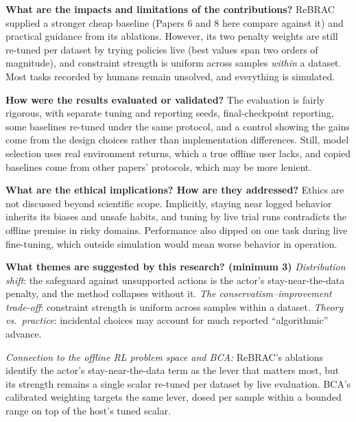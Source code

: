 \documentclass[11pt]{article}
\newcommand{\q}[2]{\item \textbf{#1} #2}
\newcommand{\tiein}[1]{\par\smallskip\noindent\emph{Connection to the offline RL problem space and BCA:} #1\par\medskip}
\begin{document}
\begin{qna}
\q{What are the impacts and limitations of the contributions?}
ReBRAC supplied a stronger cheap baseline (Papers 6 and 8 here compare against it) and practical guidance from its ablations. However, its two penalty weights are still re-tuned per dataset by trying policies live (best values span two orders of magnitude), and constraint strength is uniform across samples \emph{within} a dataset. Most tasks recorded by humans remain unsolved, and everything is simulated.

\q{How were the results evaluated or validated?}
The evaluation is fairly rigorous, with separate tuning and reporting seeds, final-checkpoint reporting, some baselines re-tuned under the same protocol, and a control showing the gains come from the design choices rather than implementation differences. Still, model selection uses real environment returns, which a true offline user lacks, and copied baselines come from other papers' protocols, which may be more lenient.

\q{What are the ethical implications? How are they addressed?}
Ethics are not discussed beyond scientific scope. Implicitly, staying near logged behavior inherits its biases and unsafe habits, and tuning by live trial runs contradicts the offline premise in risky domains. Performance also dipped on one task during live fine-tuning, which outside simulation would mean worse behavior in operation.

\q{What themes are suggested by this research? (minimum 3)}
\emph{Distribution shift}: the safeguard against unsupported actions is the actor's stay-near-the-data penalty, and the method collapses without it. \emph{The conservatism--improvement trade-off}: constraint strength is uniform across samples within a dataset. \emph{Theory vs.\ practice}: incidental choices may account for much reported ``algorithmic'' advance.

\end{qna}
\tiein{ReBRAC's ablations identify the actor's stay-near-the-data term as the lever that matters most, but its strength remains a single scalar re-tuned per dataset by live evaluation. BCA's calibrated weighting targets the same lever, dosed per sample within a bounded range on top of the host's tuned scalar.}
\end{document}
